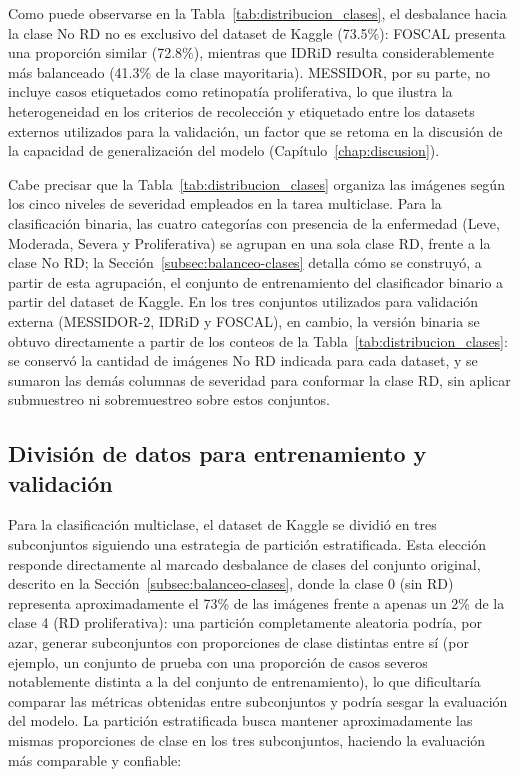 Como puede observarse en la Tabla~\ref{tab:distribucion_clases}, el desbalance hacia la
clase No RD no es exclusivo del dataset de Kaggle (73.5\%): FOSCAL presenta una
proporción similar (72.8\%), mientras que IDRiD resulta considerablemente más balanceado
(41.3\% de la clase mayoritaria). MESSIDOR, por su parte, no incluye casos etiquetados
como retinopatía proliferativa, lo que ilustra la heterogeneidad en los criterios de
recolección y etiquetado entre los datasets externos utilizados para la validación, un
factor que se retoma en la discusión de la capacidad de generalización del modelo
(Capítulo~\ref{chap:discusion}).

Cabe precisar que la Tabla~\ref{tab:distribucion_clases} organiza las imágenes según los
cinco niveles de severidad empleados en la tarea multiclase. Para la clasificación
binaria, las cuatro categorías con presencia de la enfermedad (Leve, Moderada, Severa y
Proliferativa) se agrupan en una sola clase RD, frente a la clase No RD; la
Sección~\ref{subsec:balanceo-clases} detalla cómo se construyó, a partir de esta
agrupación, el conjunto de entrenamiento del clasificador binario a partir del dataset de
Kaggle. En los tres conjuntos utilizados para validación externa (MESSIDOR-2, IDRiD y
FOSCAL), en cambio, la versión binaria se obtuvo directamente a partir de los conteos de
la Tabla~\ref{tab:distribucion_clases}: se conservó la cantidad de imágenes No RD
indicada para cada dataset, y se sumaron las demás columnas de severidad para conformar
la clase RD, sin aplicar submuestreo ni sobremuestreo sobre estos conjuntos.

\subsection{División de datos para entrenamiento y validación} \label{subsec:division-datos}

Para la clasificación multiclase, el dataset de Kaggle se dividió en tres subconjuntos
siguiendo una estrategia de partición estratificada. Esta elección responde directamente al marcado desbalance de
clases del conjunto original, descrito en la Sección~\ref{subsec:balanceo-clases}, donde
la clase 0 (sin RD) representa aproximadamente el 73\% de las imágenes frente a apenas un
2\% de la clase 4 (RD proliferativa): una partición completamente aleatoria podría, por
azar, generar subconjuntos con proporciones de clase distintas entre sí (por ejemplo, un
conjunto de prueba con una proporción de casos severos notablemente distinta a la del
conjunto de entrenamiento), lo que dificultaría comparar las métricas obtenidas entre
subconjuntos y podría sesgar la evaluación del modelo. La partición estratificada busca
mantener aproximadamente las mismas proporciones de clase en los tres subconjuntos,
haciendo la evaluación más comparable y confiable:

